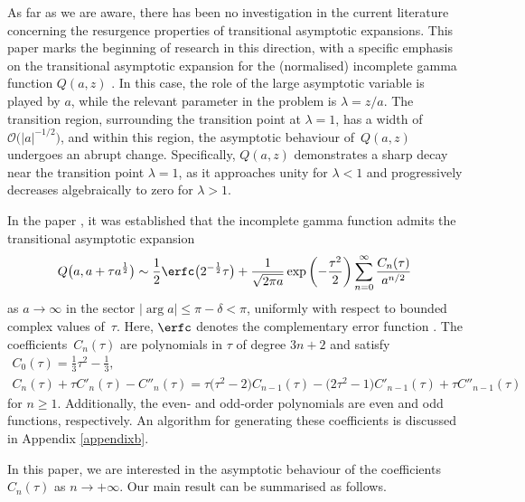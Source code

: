 As far as we are aware, there has been no investigation in the current literature concerning the resurgence properties of transitional asymptotic expansions. This paper marks the beginning of research in this direction, with a specific emphasis on the transitional asymptotic expansion for the (normalised) incomplete gamma function $Q(a, z)$ \cite[Section~8.2\,(i)]{DLMF}. In this case, the role of the large asymptotic variable is played by $a$, while the relevant parameter in the problem is $\lambda=z/a$. The transition region, surrounding the transition point at $\lambda=1$, has a width of~$\mathcal{O}\big(|a|^{-1/2}\big)$, and within this region, the asymptotic behaviour of~$Q(a,z)$ undergoes an abrupt change. Specifically, $Q(a,z)$ demonstrates a sharp decay near the transition point $\lambda=1$, as it approaches unity for $\lambda<1$ and progressively decreases algebraically to zero for $\lambda>1$.

In the paper \cite{Nemes2019}, it was established that the incomplete gamma function admits the transitional asymptotic expansion
\begin{equation}\label{eq2}
Q\big(a,a+\tau a^{\frac{1}{2}}\big) \sim \frac{1}{2} \erfc\big(2^{-\frac{1}{2}}\tau\big) + \frac{1}{\sqrt {2\pi a}}
\exp\left(-\frac{\tau^2}{2}\right) \sum_{n=0}^\infty\frac{C_n(\tau)}{a^{n/2}}
\end{equation}
as $a\to \infty$ in the sector $|\arg a| \le \pi-\delta<\pi$, uniformly with respect to bounded complex values of~$\tau$. Here, $\erfc$ denotes the complementary error function \cite[equation~(2.2)]{DLMF}. The coefficients~$C_n(\tau)$ are polynomials in $\tau$ of degree $3n+2$ and satisfy
\begin{gather}
C_0 (\tau ) = \frac{1}{3}\tau^2-\frac{1}{3},\nonumber\\
C_n (\tau ) + \tau C'_n (\tau ) - C''_n (\tau ) = \tau \big(\tau ^2 - 2\big)C_{n - 1} (\tau ) - \big(2\tau^2 - 1\big)C'_{n - 1} (\tau ) + \tau C''_{n - 1} (\tau )\label{eq32}
\end{gather}
for $n\geq 1$. Additionally, the even- and odd-order polynomials are even and odd functions, respectively. An algorithm for generating these coefficients is discussed in Appendix \ref{appendixb}.

In this paper, we are interested in the asymptotic behaviour of the coefficients $C_n(\tau)$ as $n\to+\infty$. Our main result can be summarised as follows.

